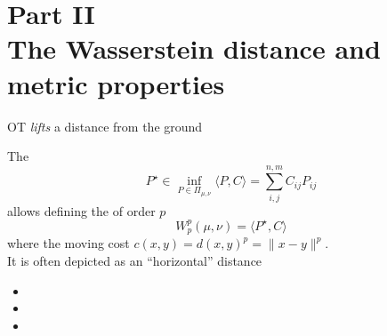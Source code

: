 \documentclass[pdf,aspectratio=169,10pt]{beamer}
\begin{document}
\section{Part II\\ The Wasserstein distance and metric properties}



\begin{frame}
    \Large {}
\end{frame}




\begin{frame}{OT \emph{lifts} a distance from the ground}
    \\
    \begin{minipage}{0.59\textwidth}
        The 
        \begin{equation*}
            P^\star \in \inf_{P\in\Pi_{\mu,\nu}} \langle P , C\rangle = \sum_{i,j}^{n,m} C_{ij}P_{ij} 
        \end{equation*}
        allows defining the  of order $p$
        \begin{equation*}
            W^p_p(\mu, \nu) =  \langle P^\star , C\rangle
        \end{equation*}
        where the moving cost $c(x, y) = {d(x, y)}^p = \| x - y \|^p$.\\
        It is often depicted as an ``horizontal'' distance
\begin{itemize}
          \item[\bred{$\checkmark$}] 
          \item[\bred{$\checkmark$}]  
          \item[\bred{$\checkmark$}] 
      \end{itemize}       
    \end{minipage}
    \hfill
    \begin{minipage}{0.4\textwidth}
    \begin{figure}
        \centering

\end{figure}
\end{minipage}
\end{frame}
\end{document}
